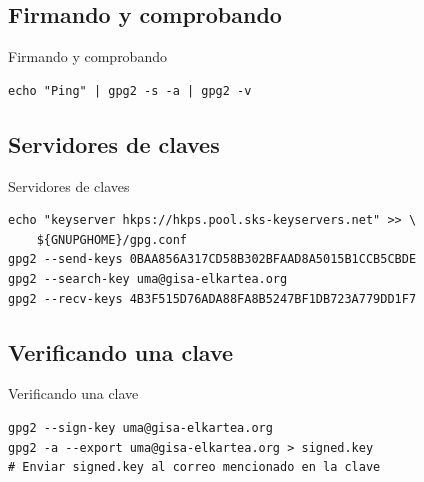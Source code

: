 \documentclass{beamer}
\begin{document}
\subsection{Firmando y comprobando}
\begin{frame}[fragile]{Firmando y comprobando}
\begin{lstlisting}
echo "Ping" | gpg2 -s -a | gpg2 -v
\end{lstlisting}
\end{frame}


\subsection{Servidores de claves}
\begin{frame}[fragile]{Servidores de claves}
\begin{lstlisting}
echo "keyserver hkps://hkps.pool.sks-keyservers.net" >> \
    ${GNUPGHOME}/gpg.conf
gpg2 --send-keys 0BAA856A317CD58B302BFAAD8A5015B1CCB5CBDE
gpg2 --search-key uma@gisa-elkartea.org
gpg2 --recv-keys 4B3F515D76ADA88FA8B5247BF1DB723A779DD1F7
\end{lstlisting}
\end{frame}


\subsection{Verificando una clave}
\begin{frame}[fragile]{Verificando una clave}
\begin{lstlisting}
gpg2 --sign-key uma@gisa-elkartea.org
gpg2 -a --export uma@gisa-elkartea.org > signed.key
# Enviar signed.key al correo mencionado en la clave
\end{lstlisting}
\end{frame}
\end{document}
